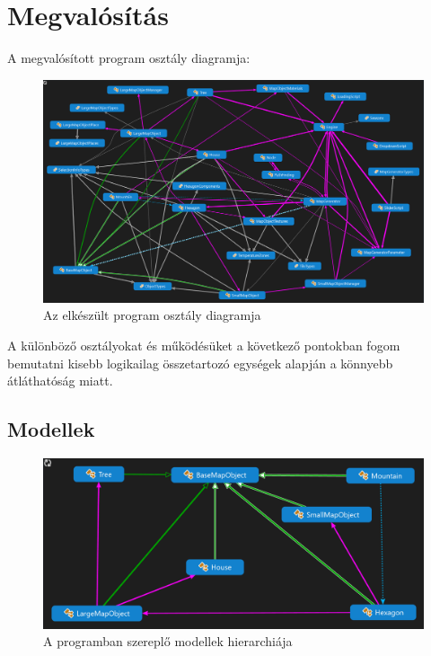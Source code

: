 \chapter{Megvalósítás}

A megvalósított program osztály diagramja:

\begin{figure}[h!]
\centering
\includegraphics[scale=0.3]{kepek/szorny.png}
\caption{Az elkészült program osztály diagramja}
\label{fig:szorny}
\end{figure}

\noindent A különböző osztályokat és működésüket a következő pontokban fogom bemutatni kisebb logikailag összetartozó egységek alapján a könnyebb átláthatóság miatt. 

\section{Modellek}

\begin{figure}[h!]
\centering
\includegraphics[scale=0.4]{kepek/modellek.png}
\caption{A programban szereplő modellek hierarchiája}
\label{fig:modellek}
\end{figure}

